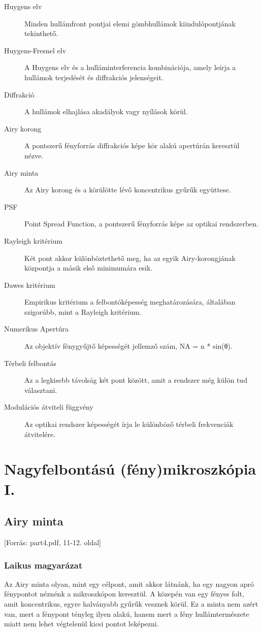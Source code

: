 \documentclass[a4paper,12pt]{article}
\begin{document}
\begin{description} \item[Huygens elv] Minden hullámfront pontjai elemi gömbhullámok kiindulópontjának tekinthető.

\item[Huygens-Fresnel elv] A Huygens elv és a hulláminterferencia kombinációja, amely leírja a hullámok terjedését és diffrakciós jelenségeit. \item[Diffrakció] A hullámok elhajlása akadályok vagy nyílások körül. \item[Airy korong] A pontszerű fényforrás diffrakciós képe kör alakú apertúrán keresztül nézve. \item[Airy minta] Az Airy korong és a körülötte lévő koncentrikus gyűrűk együttese. \item[PSF] Point Spread Function, a pontszerű fényforrás képe az optikai rendszerben. \item[Rayleigh kritérium] Két pont akkor különböztethető meg, ha az egyik Airy-korongjának központja a másik első minimumára esik. \item[Dawes kritérium] Empirikus kritérium a felbontóképesség meghatározására, általában szigorúbb, mint a Rayleigh kritérium. \item[Numerikus Apertúra] Az objektív fénygyűjtő képességét jellemző szám, NA = n * sin(θ). \item[Térbeli felbontás] Az a legkisebb távolság két pont között, amit a rendszer még külön tud választani. \item[Modulációs átviteli függvény] Az optikai rendszer képességét írja le különböző térbeli frekvenciák átvitelére.
\end{description}

\newpage

\section{Nagyfelbontású (fény)mikroszkópia I.}

\subsection{Airy minta} [Forrás: part4.pdf, 11-12. oldal]

\subsubsection{Laikus magyarázat} 
Az Airy minta olyan, mint egy célpont, amit akkor látnánk, ha egy nagyon apró fénypontot néznénk a mikroszkópon keresztül. A közepén van egy fényes folt, amit koncentrikus, egyre halványabb gyűrűk vesznek körül. Ez a minta nem azért van, mert a fénypont tényleg ilyen alakú, hanem mert a fény hullámtermészete miatt nem lehet végtelenül kicsi pontot leképezni.
\end{document}
